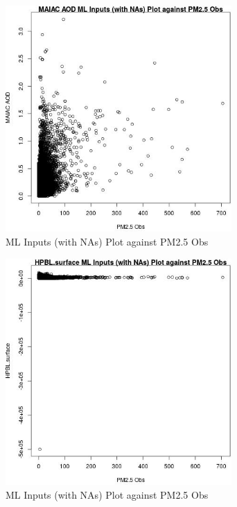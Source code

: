 \begin{figure} 
\centering  
\includegraphics[width=0.77\textwidth]{Code_Outputs/Report_ML_input_PM25_Step4_part_e_de_duplicated_aves_compiled_2019-05-14wNAs_MAIAC_AODvPM25_Obs.jpg} 
\caption{\label{fig:Report_ML_input_PM25_Step4_part_e_de_duplicated_aves_compiled_2019-05-14wNAsMAIAC_AODvPM25_Obs}ML Inputs (with NAs) Plot against PM2.5 Obs} 
\end{figure} 
 

\begin{figure} 
\centering  
\includegraphics[width=0.77\textwidth]{Code_Outputs/Report_ML_input_PM25_Step4_part_e_de_duplicated_aves_compiled_2019-05-14wNAs_HPBLsurfacevPM25_Obs.jpg} 
\caption{\label{fig:Report_ML_input_PM25_Step4_part_e_de_duplicated_aves_compiled_2019-05-14wNAsHPBLsurfacevPM25_Obs}ML Inputs (with NAs) Plot against PM2.5 Obs} 
\end{figure} 
 

